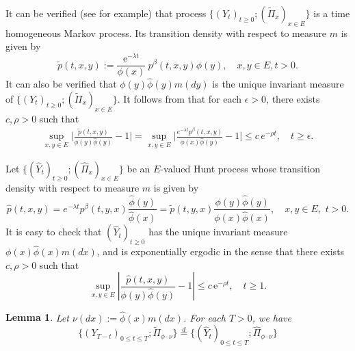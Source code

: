 \documentclass[12pt,a4paper]{amsart}
\numberwithin{equation}{section}
\theoremstyle{plain}
\newtheorem{lem}[thm]{Lemma}
\theoremstyle{definition}
\begin{document}
It can be verified (see \cite{KimSong2008Intrinsic} for example) that process $\{(Y_t)_{t\geq 0}; (\widetilde\Pi_x)_{x\in E}\}$ is a time homogeneous Markov process.
Its transition density with respect to measure $m$ is given by
\begin{equation}
  \label{eq:tilde_p}
  \widetilde p(t, x, y)
  :=\frac{\mbox{e}^{-\lambda t}}{\phi(x)}\ p^\beta(t, x, y)\phi(y),
  \quad x,y \in E,t>0.
\end{equation}
It can also be verified that $\phi(y)\widehat{\phi}(y)m(dy)$ is the unique invariant measure of $\{(Y_t)_{t\geq 0}; (\widetilde\Pi_x)_{x\in E}\}$.
It follows from \cite[Theorem 2.7]{KimSong2008Intrinsic} that for each $\epsilon > 0$, there exists $c, \rho > 0$ such that 
\begin{align}
\label{eq:IU}
	\sup_{x,y\in E}\Big|\frac{\widetilde p(t,x,y)}{\phi(y) \widehat\phi(y)}- 1\Big|
	=\sup_{x,y\in E}\Big|\frac{e^{-\lambda t}p^\beta(t,x,y)}{\phi(x) \widehat\phi(y)}- 1\Big|
	\leq c\,e^{-\rho t},
	\quad t\geq \epsilon.
\end{align}
\par
Let $\{(\widehat{Y}_t)_{t\geq 0}; (\widehat{\Pi}_x)_{x\in E}\}$ be an $E$-valued Hunt process whose transition density with respect to measure $m$ is given by
\[
  \widehat{p}(t,x,y)
  =e^{-\lambda t}p^\beta(t,y,x)\frac{{\widehat\phi}(y)}{{\widehat\phi}(x)}
  =\widetilde p(t,y,x)\frac{\phi(y){\widehat\phi}(y)}{\phi(x){\widehat\phi}(x)},
  \quad x,y \in E,\,\, t> 0.
\]
It is easy to check that $(\widehat Y_t)_{t\geq 0}$ has the unique invariant measure $\phi(x)\widehat\phi(x)m(dx)$, and is exponentially ergodic in the sense that there exists $c, \rho > 0$ such that
\begin{equation}\label{eq:IU'}
	\sup_{x,y\in E}\left|\frac{\widehat{p}(t, x,y)}{\phi(y) \widehat\phi(y)}- 1\right|\le c\,\mbox{e}^{-\rho t}, \quad t\geq 1.
\end{equation}
\begin{lem}
  \label{lem:reverse of the spine}
	Let $\nu(dx):=\widehat\phi(x)m(dx)$.
	For each $T > 0$, we have
  \[
    \{(Y_{T-t})_{0\leq t\leq T}; \widetilde \Pi_{\phi \cdot \nu}\}
    \overset{d}{=} \{(\widehat Y_{t})_{0\leq t\leq T}; \widehat \Pi_{\phi \cdot \nu}\}
  \]
\end{lem}
\end{document}
